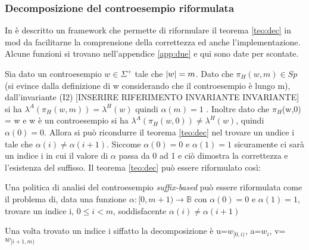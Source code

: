 \subsubsection{Decomposizione del controesempio riformulata}
In \cite{StefCounterexample14} è descritto un framework che permette di riformulare il teorema \ref{teo:dec} in mod da facilitarne la comprensione della correttezza ed anche l'implementazione. Alcune funzioni si trovano nell'appendice \ref{app:due} e qui sono date per scontate.

Sia dato un controesempio $w \in \Sigma^{+}$ tale che $\lvert w\rvert=m$. Dato che $\pi_{H}(w,m) \in Sp$ (si evince dalla definizione di w considerando che il controesempio è lungo m), dall'invariante (I2) [INSERIRE RIFERIMENTO INVARIANTE INVARIANTE] si ha $\lambda^{A}(\pi_{H}(w,m)) = \lambda^{H}(w)$ quindi $\alpha(m) = 1$ . Inoltre dato che $\pi_{H}$(w,0) = w e w è un controesempio si ha $\lambda^{A}(\pi_{H}(w,0)) \neq \lambda^{H}(w)$, quindi $\alpha(0) = 0$. Allora si può ricondurre il teorema \ref{teo:dec} nel trovare un undice i tale che $\alpha(i) \neq \alpha(i+1)$. Siccome $\alpha(0)=0 \text{ e } \alpha(1)=1$ sicuramente ci sarà un indice i in cui il valore di $\alpha$ passa da 0 ad 1 e ciò dimostra la correttezza e l'esistenza del suffisso. Il teorema \ref{teo:dec} può essere riformulato così:
\begin{teorema} \label{teo:decr}Una politica di analisi del controesempio \textit{suffix-based} può essere riformulata come il problema di, data una funzione $\alpha: [0,m+1) \to \mathbb{B}$ con $\alpha(0)=0 \text{ e } \alpha(1)=1$, trovare un indice i, $0 \leq i < m$, soddisfacente $\alpha(i) \neq \alpha(i+1)$ 
\end{teorema}
Una volta trovato un indice i siffatto la decomposizione è u=$w_{[0,i)}$, a=$w_{i}$, v=$w_{[i+1,m)}$

